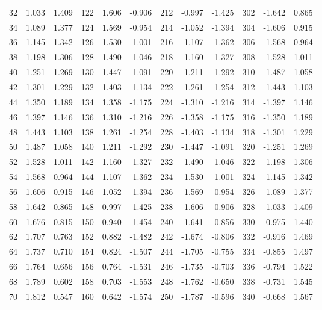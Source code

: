 \begin{table}
{\begin{tabular}{rrr|rrr|rrr|rrr}
 32 &  1.033 &  1.409 & 122 &  1.606 & -0.906 & 212 & -0.997 & -1.425 & 302 & -1.642 &  0.865\\
 34 &  1.089 &  1.377 & 124 &  1.569 & -0.954 & 214 & -1.052 & -1.394 & 304 & -1.606 &  0.915\\
 36 &  1.145 &  1.342 & 126 &  1.530 & -1.001 & 216 & -1.107 & -1.362 & 306 & -1.568 &  0.964\\
 38 &  1.198 &  1.306 & 128 &  1.490 & -1.046 & 218 & -1.160 & -1.327 & 308 & -1.528 &  1.011\\
 40 &  1.251 &  1.269 & 130 &  1.447 & -1.091 & 220 & -1.211 & -1.292 & 310 & -1.487 &  1.058\\
 42 &  1.301 &  1.229 & 132 &  1.403 & -1.134 & 222 & -1.261 & -1.254 & 312 & -1.443 &  1.103\\
 44 &  1.350 &  1.189 & 134 &  1.358 & -1.175 & 224 & -1.310 & -1.216 & 314 & -1.397 &  1.146\\
 46 &  1.397 &  1.146 & 136 &  1.310 & -1.216 & 226 & -1.358 & -1.175 & 316 & -1.350 &  1.189\\
 48 &  1.443 &  1.103 & 138 &  1.261 & -1.254 & 228 & -1.403 & -1.134 & 318 & -1.301 &  1.229\\
 50 &  1.487 &  1.058 & 140 &  1.211 & -1.292 & 230 & -1.447 & -1.091 & 320 & -1.251 &  1.269\\
 52 &  1.528 &  1.011 & 142 &  1.160 & -1.327 & 232 & -1.490 & -1.046 & 322 & -1.198 &  1.306\\
 54 &  1.568 &  0.964 & 144 &  1.107 & -1.362 & 234 & -1.530 & -1.001 & 324 & -1.145 &  1.342\\
 56 &  1.606 &  0.915 & 146 &  1.052 & -1.394 & 236 & -1.569 & -0.954 & 326 & -1.089 &  1.377\\
 58 &  1.642 &  0.865 & 148 &  0.997 & -1.425 & 238 & -1.606 & -0.906 & 328 & -1.033 &  1.409\\
 60 &  1.676 &  0.815 & 150 &  0.940 & -1.454 & 240 & -1.641 & -0.856 & 330 & -0.975 &  1.440\\
 62 &  1.707 &  0.763 & 152 &  0.882 & -1.482 & 242 & -1.674 & -0.806 & 332 & -0.916 &  1.469\\
 64 &  1.737 &  0.710 & 154 &  0.824 & -1.507 & 244 & -1.705 & -0.755 & 334 & -0.855 &  1.497\\
 66 &  1.764 &  0.656 & 156 &  0.764 & -1.531 & 246 & -1.735 & -0.703 & 336 & -0.794 &  1.522\\
 68 &  1.789 &  0.602 & 158 &  0.703 & -1.553 & 248 & -1.762 & -0.650 & 338 & -0.731 &  1.545\\
 70 &  1.812 &  0.547 & 160 &  0.642 & -1.574 & 250 & -1.787 & -0.596 & 340 & -0.668 &  1.567\\

\end{tabular}}
\end{table}
